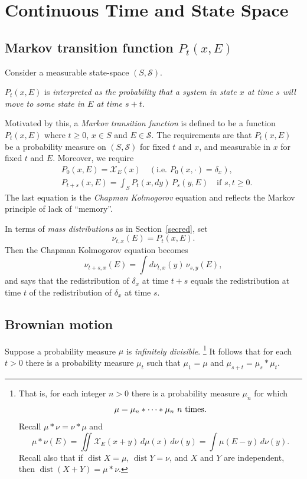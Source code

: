 \documentclass[a4paper]{amsart}
\theoremstyle{plain}
\theoremstyle{definition}
\theoremstyle{remark}
\DeclareMathOperator{\dist}{dist}
\begin{document}
\section{\textbf{Continuous Time and State Space}}\label{secctss}

\subsection{Markov transition function $ P_t(x,E) $}  Consider a measurable state-space $ ( S, \mathcal{S} ) $.

$ P_t(x,E) $ is \emph{interpreted as the probability that a system in state $ x $ at time $ s $ will move to some state in $ E $ at time $ s+ t $}.

\medskip Motivated by this, a \emph{Markov transition function} is defined to be a function $ P_t(x,E) $  where $ t\geq 0 $, $ x\in S $ and $ E \in \mathcal{S} $.  The requirements are that $ P_t(x,E) $ be a probability measure on $   ( S, \mathcal{S} ) $ for fixed $ t $ and $ x  $,  and measurable in $ x $ for fixed $ t $ and $ E $. Moreover, we require
\begin{equation} \label{mtf}
\begin{aligned}
&P_0(x,E) = \mathcal{X} _E(x)  \quad (\text{i.e.\ } P_0(x,\cdot) = \delta_x),\\
& P_{t+s}(x,E) = \int_S P_t(x,dy)\,  P_s(y,E) \quad \text{if } s,t\geq 0 .
\end{aligned} 
\end{equation}
The last equation is the \emph{Chapman Kolmogorov} equation and reflects the Markov principle of lack of ``memory''.

\medskip
In terms of \emph{mass distributions} as in Section~\ref{secred},  set 
\[  \nu_{t,x} (E) = P_t(x,E). \]
Then the  Chapman Kolmogorov  equation becomes
\[  \nu_{t+s,x}(E) = \int d\nu_{t,x}  (y)\, \nu_{s,y}(E),  \]
and says that the redistribution of $ \delta_x $ at time $ t+s $  equals the redistribution at   time $ t $ of the redistribution of $ \delta_x $  at time $ s $.




\subsection{Brownian motion}
Suppose a probability measure $ \mu $ is \emph{infinitely divisible}.%
\footnote{That is, for each integer $ n>0 $ there is a probability measure $ \mu_n $ for which 
\[ \mu = \mu_n * \cdots * \mu_n \text{\ $ n $ times}.\]
 Recall $ \mu*\nu = \nu*\mu $ and 
\[ \mu*\nu(E) = \iint \mathcal{X}_{E}(x+y)\, d\mu(x)\, d\nu(y) 
   =   \int \mu(E-y) \, d\nu(y).
   \]
   Recall also that if $ \dist  X  = \mu $, $ \dist  Y  =\nu $, and $ X $ and $ Y $ are independent, then $ \dist (X+Y) = \mu * \nu $.
   }
It follows that for each $  t>0 $ there is a probability measure $ \mu_t $ such that $ \mu_1=\mu $ and  $ \mu_{s+t} = \mu_s * \mu_t $.  
\end{document}
